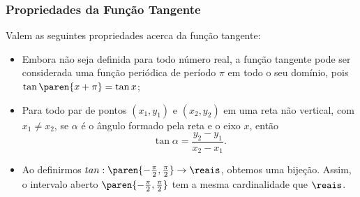 \subsubsection{Propriedades da Função Tangente}

\begin{proposition}
    Valem as seguintes propriedades acerca da função tangente:

\begin{itemize}
  \item Embora não seja definida para todo número real, a função
  tangente pode ser considerada uma função periódica de período
  $\pi$ em todo o seu domínio, pois $\tan \paren{x+\pi} = \tan x$;
  \item Para todo par de pontos  $(x_1, y_1)$ e $(x_2, y_2)$ em uma reta não vertical, com $x_1 \neq x_2$, se
  $\alpha$ é o ângulo formado pela reta e o eixo $x$, então $$\tan
  \alpha = \frac {y_2 - y_1} {x_2 - x_1}.$$
  \item Ao definirmos $tan: \paren{- \frac {\pi} 2, \frac {\pi} 2} \to \reais$,
obtemos uma bijeção. Assim, o intervalo aberto $\paren{- \frac {\pi}
2, \frac {\pi} 2}$ tem a mesma cardinalidade que $\reais$.
\end{itemize}
\end{proposition}